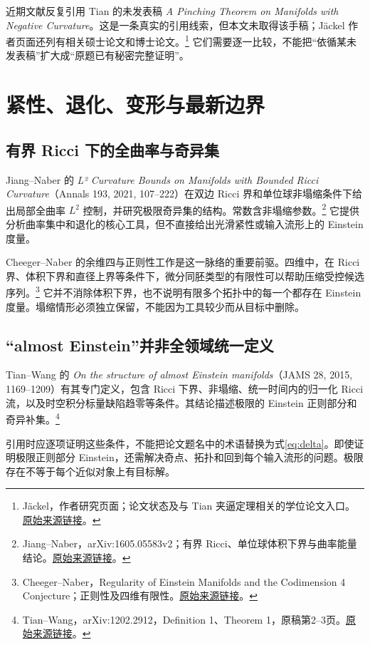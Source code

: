 \documentclass[11pt,a4paper]{article}
\theoremstyle{definition}
\newcommand{\src}[3]{\footnote{\raggedright #1，#2。\href{#3}{原始来源链接}。}}
\begin{document}
近期文献反复引用 Tian 的未发表稿 \emph{A Pinching Theorem on Manifolds with Negative Curvature}。这是一条真实的引用线索，但本文未取得该手稿；Jäckel 作者页面还列有相关硕士论文和博士论文。\src{Jäckel}{作者研究页面；论文状态及与 Tian 夹逼定理相关的学位论文入口}{https://www.friederjaeckel.com/research}
它们需要逐一比较，不能把“依循某未发表稿”扩大成“原题已有秘密完整证明”。

\section{紧性、退化、变形与最新边界}\label{sec:frontier}

\subsection{有界 Ricci 下的全曲率与奇异集}

Jiang--Naber 的 \emph{L² Curvature Bounds on Manifolds with Bounded Ricci Curvature}（Annals 193, 2021, 107--222）在双边 Ricci 界和单位球非塌缩条件下给出局部全曲率 $L^2$ 控制，并研究极限奇异集的结构。常数含非塌缩参数。\src{Jiang--Naber}{arXiv:1605.05583v2；有界 Ricci、单位球体积下界与曲率能量结论}{https://arxiv.org/abs/1605.05583v2}
它提供分析曲率集中和退化的核心工具，但不直接给出光滑紧性或输入流形上的 Einstein 度量。

Cheeger--Naber 的余维四与正则性工作是这一脉络的重要前驱。四维中，在 Ricci 界、体积下界和直径上界等条件下，微分同胚类型的有限性可以帮助压缩受控候选序列。\src{Cheeger--Naber}{Regularity of Einstein Manifolds and the Codimension 4 Conjecture；正则性及四维有限性}{https://arxiv.org/abs/1406.6534}
它并不消除体积下界，也不说明有限多个拓扑中的每一个都存在 Einstein 度量。塌缩情形必须独立保留，不能因为工具较少而从目标中删除。

\subsection{“almost Einstein”并非全领域统一定义}

Tian--Wang 的 \emph{On the structure of almost Einstein manifolds}（JAMS 28, 2015, 1169--1209）有其专门定义，包含 Ricci 下界、非塌缩、统一时间内的归一化 Ricci 流，以及时空积分标量缺陷趋零等条件。其结论描述极限的 Einstein 正则部分和奇异补集。\src{Tian--Wang}{arXiv:1202.2912，Definition 1、Theorem 1，原稿第2--3页}{https://arxiv.org/abs/1202.2912}

引用时应逐项证明这些条件，不能把论文题名中的术语替换为式\eqref{eq:delta}。即使证明极限正则部分 Einstein，还需解决奇点、拓扑和回到每个输入流形的问题。极限存在不等于每个近似对象上有目标解。
\end{document}
